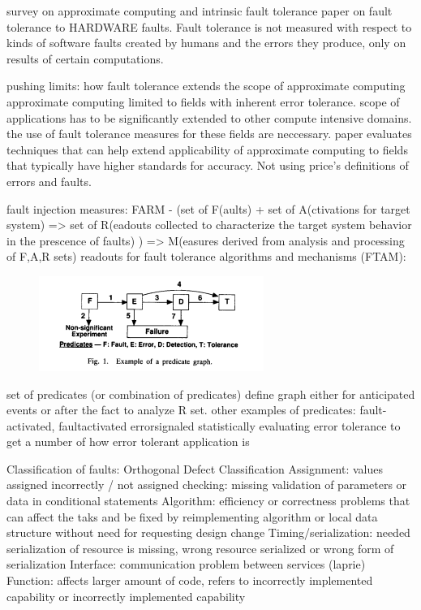 survey on approximate computing and intrinsic fault tolerance \cite{rodrigues2020survey}
paper on fault tolerance to HARDWARE faults. Fault tolerance is not measured with respect to kinds of software faults created by humans and the errors they produce, only on results of certain computations.




pushing limits: how fault tolerance extends the scope of approximate computing
approximate computing limited to fields with inherent error tolerance. scope of applications has to be significantly extended to other compute intensive domains. the use of fault tolerance measures for these fields are neccessary. paper evaluates techniques that can help extend applicability of approximate computing to fields that typically have higher standards for accuracy. Not using price's definitions of errors and faults.\cite{wunderlich2016pushing}






fault injection measures: 
FARM 
- (set of F(aults) + set of A(ctivations for target system)  => set of R(eadouts collected to characterize the target system behavior in the prescence of faults) ) => M(easures derived from analysis and processing of F,A,R sets) 
readouts for fault tolerance algorithms and mechanisms (FTAM):

\begin{figure}
    \centering
    \includegraphics[width=0.5\linewidth]{Images/Readout predicates.png}
    \label{fig:enter-label}
\end{figure}
set of predicates (or combination of predicates) define graph either for anticipated events or after the fact to analyze R set.
other examples of predicates:
{fault-activated}, {faultactivated
errorsignaled} 
statistically evaluating error tolerance to get a number of how error tolerant application is\cite{arlat1993fault}



Classification of faults:  Orthogonal Defect Classification
Assignment: values assigned incorrectly / not assigned
checking: missing validation of parameters or data in conditional statements
Algorithm: efficiency or correctness problems that can affect the taks and be   
    fixed by reimplementing algorithm or local data structure without need for requesting design change
Timing/serialization: needed serialization of resource is missing, wrong resource 
    serialized or wrong form of serialization
Interface: communication problem between services (laprie)
Function: affects larger amount of code, refers to incorrectly implemented  
    capability or incorrectly implemented capability

